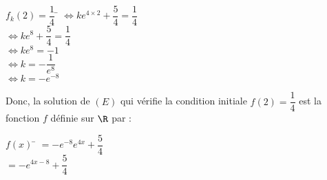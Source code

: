 \documentclass[a4paper,11pt,cours]{nsi} %
\begin{document}
\begin{methode}[ : Résoudre une équation différentielle $y'=ay+b$]
\begin{enumerate}
\begin{tabbing}
            $f_k(2)=\dfrac{1}{4}$ \= $\iff ke^{4\times 2}+\dfrac{5}{4}=\dfrac{1}{4}$\\
            \> $\iff ke^8+\dfrac{5}{4}=\dfrac{1}{4}$\\
            \> $\iff ke^8=-1$\\
            \> $\iff k=-\dfrac{1}{e^8}$\\[.5em]
            \> $\iff k=-e^{-8}$
        \end{tabbing}
        Donc, la solution de $(E)$ qui vérifie la condition initiale $f(2)=\dfrac{1}{4}$ est la fonction $f$ définie sur $\R$ par :
        \begin{tabbing}
            $f(x)$ \= $=-e^{-8}e^{4x}+\dfrac{5}{4}$\\[.5em]
            \> $=-e^{4x-8}+\dfrac{5}{4}$
        \end{tabbing}
    \end{enumerate}
\end{methode}
\end{document}
